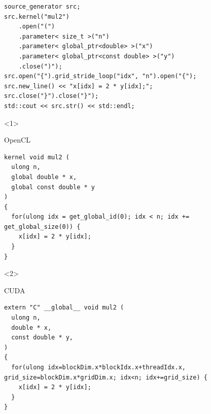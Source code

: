 \documentclass[@BEAMER_OPTIONS@]{beamer}
\begin{document}
\begin{frame}[fragile]
    \begin{exampleblock}{}
        \begin{adjustbox}{width=0.83\textwidth, height=0.4\textheight, keepaspectratio}
            \begin{minipage}{\textwidth}
                \begin{lstlisting}
source_generator src;
src.kernel("mul2")
    .open("(")
    .parameter< size_t >("n")
    .parameter< global_ptr<double> >("x")
    .parameter< global_ptr<const double> >("y")
    .close(")");
src.open("{").grid_stride_loop("idx", "n").open("{");
src.new_line() << "x[idx] = 2 * y[idx];";
src.close("}").close("}");
std::cout << src.str() << std::endl;
                \end{lstlisting}
            \end{minipage}
        \end{adjustbox}
    \end{exampleblock}
    \begin{onlyenv}<1>
        \begin{exampleblock}{OpenCL}
            \begin{adjustbox}{width=0.83\textwidth, height=0.4\textheight, keepaspectratio}
                \begin{minipage}{\textwidth}
                    \begin{lstlisting}
kernel void mul2 (
  ulong n,
  global double * x,
  global const double * y
)
{
  for(ulong idx = get_global_id(0); idx < n; idx += get_global_size(0)) {
    x[idx] = 2 * y[idx];
  }
}
                    \end{lstlisting}
                \end{minipage}
            \end{adjustbox}
        \end{exampleblock}
    \end{onlyenv}
    \begin{onlyenv}<2>
        \begin{exampleblock}{CUDA}
            \begin{adjustbox}{width=0.83\textwidth, height=0.4\textheight, keepaspectratio}
                \begin{minipage}{\textwidth}
                    \begin{lstlisting}
extern "C" __global__ void mul2 (
  ulong n,
  double * x,
  const double * y,
)
{
  for(ulong idx=blockDim.x*blockIdx.x+threadIdx.x, grid_size=blockDim.x*gridDim.x; idx<n; idx+=grid_size) {
    x[idx] = 2 * y[idx];
  }
}
                    \end{lstlisting}
                \end{minipage}
            \end{adjustbox}
        \end{exampleblock}
    \end{onlyenv}
\end{frame}
\end{document}
